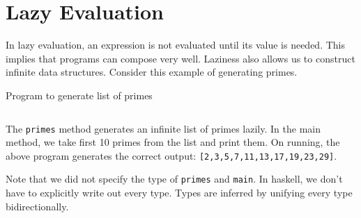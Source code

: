 \section{Lazy Evaluation}
In lazy evaluation, an expression is not evaluated until its value is needed. This implies that programs can compose very well. Laziness also allows us to construct infinite data structures. Consider this example of generating primes.

\begin{program}
  \caption{Program to generate list of primes}
  \label{prog:list-of-primes}
  \inputminted{haskell}{hs/primes.hs}
\end{program}

The \texttt{primes} method generates an infinite list of primes lazily. In the main method, we take first 10 primes from the list and print them. On running, the above program generates the correct output: \texttt{[2,3,5,7,11,13,17,19,23,29]}.

Note that we did not specify the type of \texttt{primes} and \texttt{main}. In haskell, we don't have to explicitly write out every type. Types are inferred by unifying every type bidirectionally.
